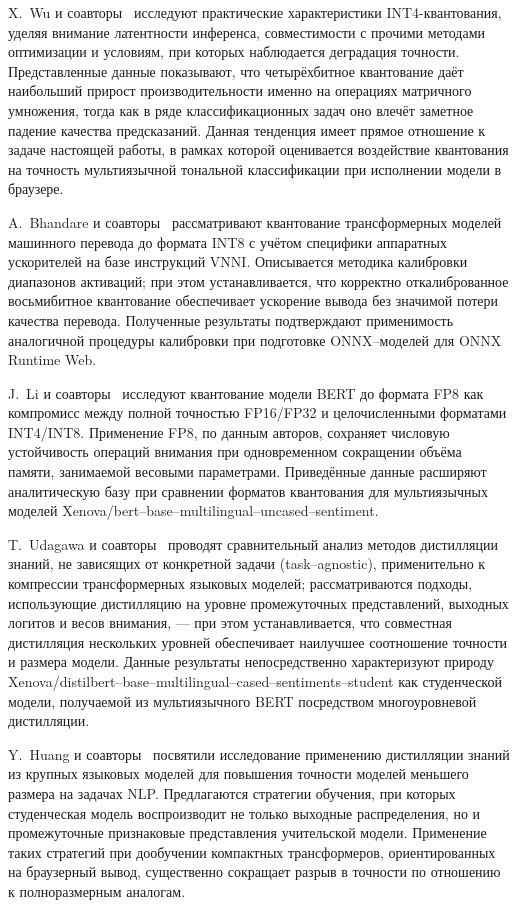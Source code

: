 X.~Wu и соавторы~\cite{wu2023int4} исследуют практические характеристики INT4-квантования, уделяя внимание латентности инференса, совместимости с прочими методами оптимизации и условиям, при которых наблюдается деградация точности. Представленные данные показывают, что четырёхбитное квантование даёт наибольший прирост производительности именно на операциях матричного умножения, тогда как в ряде классификационных задач оно влечёт заметное падение качества предсказаний. Данная тенденция имеет прямое отношение к задаче настоящей работы, в рамках которой оценивается воздействие квантования на точность мультиязычной тональной классификации при исполнении модели в браузере.
 
A.~Bhandare и соавторы~\cite{bhandare2019int8} рассматривают квантование трансформерных моделей машинного перевода до формата INT8 с учётом специфики аппаратных ускорителей на базе инструкций VNNI. Описывается методика калибровки диапазонов активаций; при этом устанавливается, что корректно откалиброванное восьмибитное квантование обеспечивает ускорение вывода без значимой потери качества перевода. Полученные результаты подтверждают применимость аналогичной процедуры калибровки при подготовке ONNX–моделей для ONNX Runtime Web.
 
J.~Li и соавторы~\cite{li2023fp8bert} исследуют квантование модели BERT до формата FP8 как компромисс между полной точностью FP16/FP32 и целочисленными форматами INT4/INT8. Применение FP8, по данным авторов, сохраняет числовую устойчивость операций внимания при одновременном сокращении объёма памяти, занимаемой весовыми параметрами. Приведённые данные расширяют аналитическую базу при сравнении форматов квантования для мультиязычных моделей Xenova/bert–base–multilingual–uncased–sentiment.
 
T.~Udagawa и соавторы~\cite{udagawa2023distillation} проводят сравнительный анализ методов дистилляции знаний, не зависящих от конкретной задачи (task–agnostic), применительно к компрессии трансформерных языковых моделей; рассматриваются подходы, использующие дистилляцию на уровне промежуточных представлений, выходных логитов и весов внимания, — при этом устанавливается, что совместная дистилляция нескольких уровней обеспечивает наилучшее соотношение точности и размера модели. Данные результаты непосредственно характеризуют природу Xenova/distilbert–base–multilingual–cased–sentiments–student как студенческой модели, получаемой из мультиязычного BERT посредством многоуровневой дистилляции.
 
Y.~Huang и соавторы~\cite{huang2024kdnlp} посвятили исследование применению дистилляции знаний из крупных языковых моделей для повышения точности моделей меньшего размера на задачах NLP. Предлагаются стратегии обучения, при которых студенческая модель воспроизводит не только выходные распределения, но и промежуточные признаковые представления учительской модели. Применение таких стратегий при дообучении компактных трансформеров, ориентированных на браузерный вывод, существенно сокращает разрыв в точности по отношению к полноразмерным аналогам.
 
